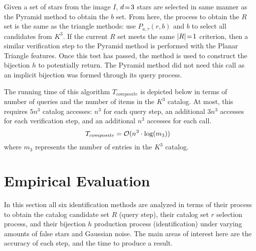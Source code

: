 \documentclass[conference]{IEEEtran}
\begin{document}
    Given a set of stars from the image $I$, $d \!=\! 3$ stars are selected in same manner as the Pyramid method to obtain
    the $b$ set.
    From here, the process to obtain the $R$ set is the same as the triangle methods: use $P_{a, \tau}(r, b)$ and $b$ to
    select all candidates from $K^3$.
    If the current $R$ set meets the same $\left| R \right| \!=\! 1$ criterion, then a similar verification step to the Pyramid method
    is performed with the Planar Triangle features.
    Once this test has passed, the  method is used to construct the bijection $h$ to potentially return.
    The Pyramid method did not need this call as an implicit bijection was formed through its query process.

    The running time of this algorithm $T_{composite}$ is depicted below in terms of number of queries and the number of
    items in the $K^3$ catalog.
    At most, this requires $5n^3$ catalog accesses: $n^3$ for each query step, an additional $3n^3$ accesses for each
    verification step, and an additional $n^3$ accesses for each  call.
    \begin{equation}
        T_{composite} = \mathcal{O} (n^3 \cdot \log(m_3))
    \end{equation}
    where $m_3$ represents the number of entries in the $K^3$ catalog.



    \newcommand{\AVG}{\mathit{AVG}}

    \section{Empirical Evaluation}\label{sec:empiricalEvaluation}
    In this section all six identification methods are analyzed in terms of their process to obtain the catalog candidate
    set $R$ (query step), their catalog set $r$ selection process, and their bijection $h$ production process
    (identification) under varying amounts of false stars and Gaussian noise.
    The main areas of interest here are the accuracy of each step, and the time to produce a result.
\end{document}
